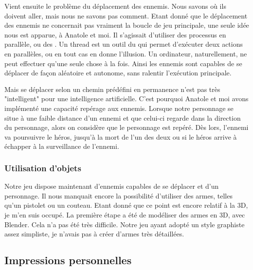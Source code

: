 \documentclass[12pt]{article}
\begin{document}
Vient ensuite le problème du déplacement des ennemis. Nous savons où ils doivent aller, mais nous ne savons pas comment. Etant donné que le déplacement des ennemis ne concernait pas vraiment la boucle de jeu principale, une seule idée nous est apparue, à Anatole et moi. Il s'agissait d'utiliser des processus en parallèle, ou des . Un thread est un outil du  qui permet d'exécuter deux actions en parallèles, ou en tout cas en donne l'illusion. Un ordinateur, naturellement, ne peut effectuer qu'une seule chose à la fois. Ainsi les ennemis sont capables de se déplacer de façon aléatoire et autonome, sans ralentir l'exécution principale. 

Mais se déplacer selon un chemin prédéfini en permanence n'est pas très "intelligent" pour une intelligence artificielle. C'est pourquoi Anatole et moi avons implémenté une capacité repérage aux ennemis.  Lorsque notre personnage se situe à une faible distance d'un ennemi et que celui-ci regarde dans la direction du personnage, alors on considère que le personnage est repéré. Dès lors, l'ennemi va poursuivre le héros, jusqu'à la mort de l'un des deux ou si le héros arrive à échapper à la surveillance de l'ennemi.




\subsubsection{Utilisation d'objets}

Notre jeu dispose maintenant d'ennemis capables de se déplacer et d'un personnage. Il nous manquait encore la possibilité d'utiliser des armes, telles qu'un pistolet ou un couteau. Etant donné que ce point est encore relatif à la 3D, je m'en suis occupé. La première étape a été de modéliser des armes en 3D, avec Blender. Cela n'a pas été très difficile. Notre jeu ayant adopté un style graphiste assez simpliste, je n'avais pas à créer d'armes très détaillées. 




\newpage

\subsection{Impressions personnelles}

\subsubsection{}

\newpage
\listoffigures
\end{document}
